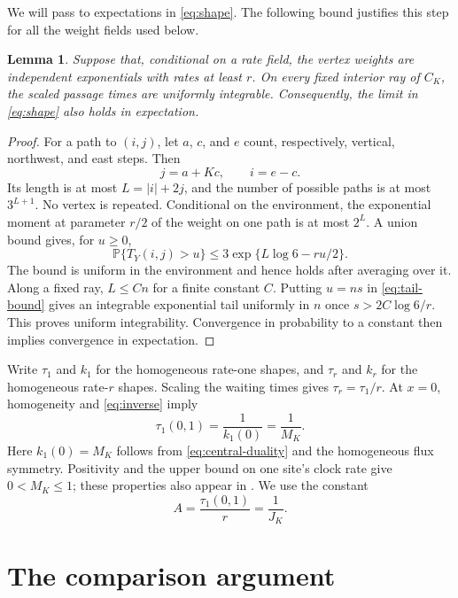 \documentclass[11pt]{amsart}
\newtheorem{lemma}[theorem]{Lemma}
\theoremstyle{remark}
\newcommand{\PP}{\mathbb P}
\numberwithin{equation}{section}
\begin{document}
We will pass to expectations in \eqref{eq:shape}. The following bound
justifies this step for all the weight fields used below.

\begin{lemma}\label{lem:tails}
Suppose that, conditional on a rate field, the vertex weights are
independent exponentials with rates at least $r$. On every fixed
interior ray of $C_K$, the scaled passage times are uniformly
integrable. Consequently, the limit in \eqref{eq:shape} also holds
in expectation.
\end{lemma}

\begin{proof}
For a path to $(i,j)$, let $a$, $c$, and $e$ count, respectively,
vertical, northwest, and east steps. Then
\[
 j=a+Kc,\qquad i=e-c.
\]
Its length is at most $L=|i|+2j$, and the number of possible paths
is at most $3^{L+1}$. No vertex is repeated. Conditional on the
environment, the exponential moment at parameter $r/2$ of the weight
on one path is at most $2^L$. A union bound gives, for $u\geq0$,
\begin{equation}\label{eq:tail-bound}
 \PP\{T_Y(i,j)>u\}\leq
 3\exp\{L\log6-ru/2\}.
\end{equation}
The bound is uniform in the environment and hence holds after averaging
over it. Along a fixed ray, $L\leq Cn$ for a finite constant $C$.
Putting $u=ns$ in \eqref{eq:tail-bound} gives an integrable exponential
tail uniformly in $n$ once $s>2C\log6/r$. This proves uniform
integrability. Convergence in probability to a constant then implies
convergence in expectation.
\end{proof}

Write $\tau_1$ and $k_1$ for the homogeneous rate-one shapes, and
$\tau_r$ and $k_r$ for the homogeneous rate-$r$ shapes. Scaling the
waiting times gives $\tau_r=\tau_1/r$. At $x=0$, homogeneity and
\eqref{eq:inverse} imply
\begin{equation}\label{eq:reciprocal}
 \tau_1(0,1)=\frac1{k_1(0)}=\frac1{M_K}.
\end{equation}
Here $k_1(0)=M_K$ follows from \eqref{eq:central-duality} and the
homogeneous flux symmetry. Positivity and the upper bound on one site's
clock rate give $0<M_K\leq1$; these properties also appear in
\cite[Theorem 9.5]{SeppNotes}. We use the constant
\begin{equation}\label{eq:A}
 A=\frac{\tau_1(0,1)}r=\frac1{J_K}.
\end{equation}

\section{The comparison argument}\label{sec:comparison}
\end{document}
